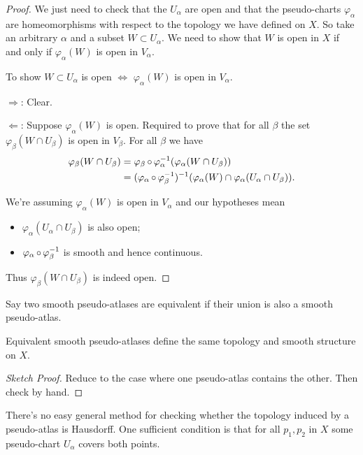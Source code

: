 \documentclass[a4paper,11pt]{article}
\begin{document}
	\begin{proof}
		We just need to check that the $U_\alpha$ are open and that the pseudo-charts $\varphi_\alpha$ are homeomorphisms with respect to the topology we have defined on $X$. So take an arbitrary $\alpha$ and a subset $W \subset U_\alpha$. We need to show that $W$ is open in $X$ if and only if $\varphi_\alpha(W)$ is open in $V_\alpha$.
		
		To show $W \subset U_\alpha$ is open $\Leftrightarrow$ $\varphi_\alpha(W)$ is open in $V_\alpha$.

		$\Rightarrow$: Clear.

		$\Leftarrow$: Suppose $\varphi_\alpha(W)$ is open. Required to prove that for all $\beta$ the set $\varphi_\beta (W\cap U_\beta)$ is open in $V_\beta$. For all $\beta$ we have
		\begin{align*}
			\varphi_\beta (W \cap U_\beta) & = \varphi_\beta \operatorname{\circ} \varphi_\alpha^{-1} ( \varphi_\alpha (W\cap U_\beta))\\
			& = (\varphi_\alpha \operatorname{\circ} \varphi_\beta^{-1})^{-1} (\varphi_\alpha(W)\cap \varphi_\alpha(U_\alpha \cap U_\beta)).
		\end{align*}

		We're assuming $\varphi_\alpha(W)$ is open in $V_\alpha$ and our hypotheses mean
		\begin{itemize}
			\item $\varphi_\alpha(U_\alpha\cap U_\beta)$ is also open;
			\item $\varphi_\alpha \operatorname{\circ} \varphi_\beta^{-1}$ is smooth and hence continuous.
		\end{itemize}

		Thus $\varphi_\beta(W \cap U_\beta)$ is indeed open.
	\end{proof}

	Say two smooth pseudo-atlases are equivalent if their union is also a smooth pseudo-atlas.

	\begin{lem}
		Equivalent smooth pseudo-atlases define the same topology and smooth structure on $X$.
	\end{lem}

	\begin{proof}[Sketch Proof]
		Reduce to the case where one pseudo-atlas contains the other. Then check by hand.
	\end{proof}

	There's no easy general method for checking whether the topology induced by a pseudo-atlas is Hausdorff. One sufficient condition is that for all $p_1,p_2$ in $X$ some pseudo-chart $U_\alpha$ covers both points.
	
\end{document}
